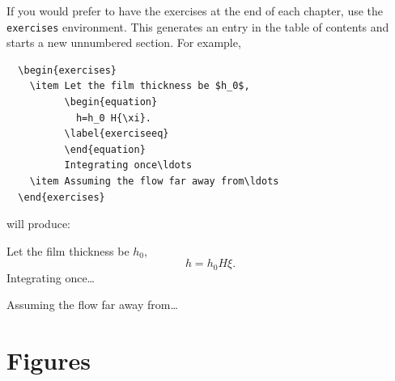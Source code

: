 If you would prefer to have the exercises at the end of each chapter, use the \verb"exercises" environment. This generates an entry in the table of contents and starts a new unnumbered section. For example,
\begin{verbatim}
  \begin{exercises}
    \item Let the film thickness be $h_0$,
          \begin{equation}
            h=h_0 H{\xi}.
          \label{exerciseeq}
          \end{equation}
          Integrating once\ldots
    \item Assuming the flow far away from\ldots
  \end{exercises}
\end{verbatim}
will produce:
  \begin{exercises}
    \item Let the film thickness be $h_0$,
          \begin{equation}
            h=h_0 H{\xi}.
          \label{exerciseeq}
          \end{equation}
          Integrating once\ldots
    \item Assuming the flow far away from\ldots
  \end{exercises}

\section{Figures}

